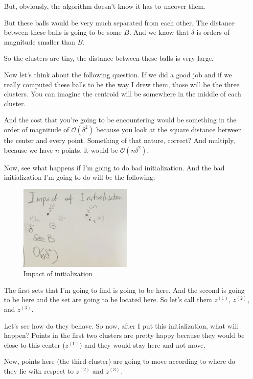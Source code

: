 \documentclass[a4paper, 12pt]{article}
\begin{document}
But, obviously, the algorithm doesn't know it has to uncover them.

But these balls would be very much separated from each other. The distance
between these balls is going to be some \(B\). And we know that \(\delta\) is
orders of magnitude smaller than \(B\).

So the clusters are tiny, the distance between these balls is very large.

Now let's think about the following question. If we did a good job and if we
really computed these balls to be the way I drew them, those will be the three
clusters. You can imagine the centroid will be somewhere in the middle of each
cluster.

And the cost that you're going to be encountering would be something in the
order of magnitude of \(\mathcal{O}(\delta^{2})\) because you look at the square
distance between the center and every point. Something of that nature, correct?
And multiply, because we have \(n\) points, it would be
\(\mathcal{O}(n\delta^{2})\).

Now, see what happens if I'm going to do bad initialization. And the bad
initialization I'm going to do will be the following:

\begin{figure}[H]
\centering
\includegraphics[width=0.5\textwidth]{./pic/04-08-fig-02.png}
\caption{\label{fig:org0d546c2}Impact of initialization}
\end{figure}

The first sets that I'm going to find is going to be here. And the second is
going to be here and the set are going to be located here. So let's call them
\(z^{(1)}\), \(z^{(2)}\), and \(z^{(3)}\).

Let's see how do they behave. So now, after I put this initialization, what will
happen? Points in the first two clusters are pretty happy because they would be
close to this center (\(z^{(1)}\)) and they would stay here and not move.

Now, points here (the third cluster) are going to move according to where do
they lie with respect to \(z^{(2)}\) and \(z^{(3)}\).
\end{document}
